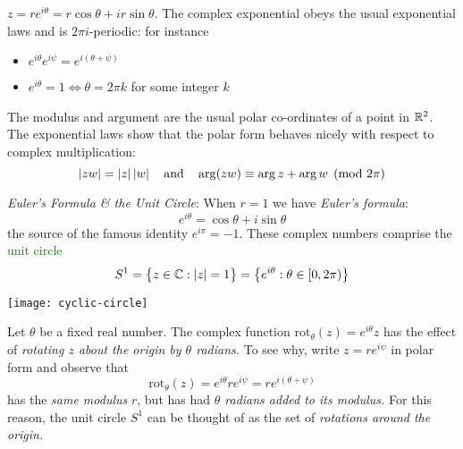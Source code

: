 \begin{description}
	\item[\emph{Polar form}:] $z=re^{i\theta} =r\cos\theta+ir\sin\theta$. The complex exponential obeys the usual exponential laws and is $2\pi i$-periodic: for instance
	\begin{itemize}
		 \item $e^{i\theta}e^{i\psi}=e^{i(\theta+\psi)}$
		 \item $e^{i\theta}=1\iff \theta=2\pi k$ for some integer $k$
	\end{itemize}
	The modulus and argument are the usual polar co-ordinates of a point in $\mathbb{R}^2$. The exponential laws show that the polar form behaves nicely with respect to complex multiplication:
	\[
		\left| zw\right|=\left| z\right|\left| w\right|\quad \text{and}\quad \arg(zw)\equiv \arg z+\arg w \pmod{2\pi}
	\]
	\begin{minipage}[t]{0.7\linewidth}\vspace{-5pt}
		\item[\emph{Euler's Formula \& the Unit Circle}:] When $r=1$ we have \emph{Euler's formula}:
		\[
			e^{i\theta}=\cos\theta+i\sin\theta
		\]
		the source of the famous identity $\displaystyle e^{i\pi}=-1$. These complex numbers comprise the \textcolor{Green}{unit circle}
		\[
			S^1 =\bigl\{z\in\mathbb{C}:\left| z\right|=1\bigr\} =\bigl\{e^{i\theta}:\theta\in[0,2\pi)\bigr\}
		\]
	\end{minipage}
	\hfill
	\begin{minipage}[t]{0.28\linewidth}\vspace{-12pt}
		\flushright%
		\texttt{[image: cyclic-circle]}
	\end{minipage}
	
	\item[\emph{Rotations}:] Let $\theta$ be a fixed real number. The complex function $\text{rot}_\theta(z)=e^{i\theta}z$ has the effect of \emph{rotating $z$ about the origin by $\theta$ radians.} To see why, write $z=re^{i\psi}$ in polar form and observe that
	\[
		\text{rot}_\theta(z)= e^{i\theta}re^{i\psi}=re^{i(\theta+\psi)}
	\]
	has the \emph{same modulus} $r$, but has had \emph{$\theta$ radians added to its modulus.} For this reason, the unit circle $S^1$ can be thought of as the set of \emph{rotations around the origin.} 
\end{description}

	